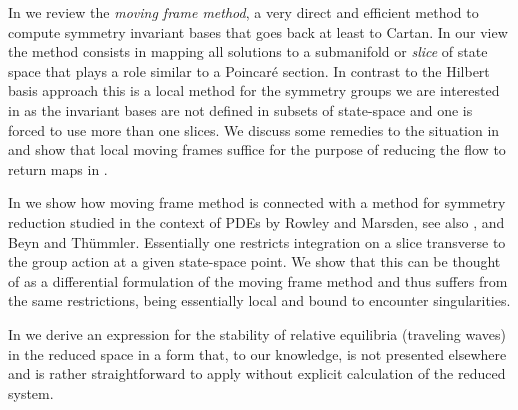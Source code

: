 In  we review the \emph{moving frame method}, a very direct and efficient method to compute 
symmetry invariant bases that goes back at least to Cartan. In our view the method consists in mapping all solutions
to a submanifold or \emph{slice} of state space that plays a role similar to a Poincar\'e section. In contrast to the Hilbert basis approach this 
is a local method for the symmetry groups we are interested in as the invariant bases are not defined in subsets 
of state-space and one is forced to use more than one slices. We discuss some remedies to the situation 
in  and show that local moving frames 
suffice for the purpose of reducing the flow to return maps in .

In  we show how moving frame method is connected with a method for symmetry reduction studied in
the context of PDEs by Rowley and Marsden, see also , 
and Beyn and Th\"ummler. Essentially one restricts integration on a slice transverse to 
the group action at a given state-space point. We show that this can be thought of as a differential formulation 
of the moving frame method and thus suffers from the same restrictions, being essentially local 
and bound to encounter singularities.  

In  we derive an expression for the stability of relative equilibria (traveling waves) in the reduced space
in a form that, to our knowledge, is not presented elsewhere and is rather straightforward to apply without explicit calculation of
the reduced system. 






